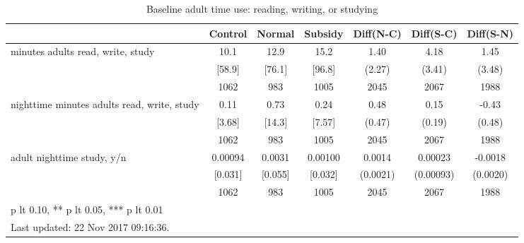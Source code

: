 \begin{table}[htbp]\centering
\def\sym#1{\ifmmode^{#1}\else\(^{#1}\)\fi}
\caption{Baseline adult time use: reading, writing, or studying \label{tab:"balance"}}
\begin{tabular*}{1\hsize}{@{\hskip\tabcolsep\extracolsep\fill}l*{1}{cccccc}}
\toprule
                                &  Control&   Normal&  Subsidy&Diff(N-C)         &Diff(S-C)         &Diff(S-N)         \\
\midrule
minutes adults read, write, study&     10.1&     12.9&     15.2&     1.40         &     4.18         &     1.45         \\
                                &   [58.9]&   [76.1]&   [96.8]&   (2.27)         &   (3.41)         &   (3.48)         \\
                                &     1062&      983&     1005&     2045         &     2067         &     1988         \\
nighttime minutes adults read, write, study&     0.11&     0.73&     0.24&     0.48         &     0.15         &    -0.43         \\
                                &   [3.68]&   [14.3]&   [7.57]&   (0.47)         &   (0.19)         &   (0.48)         \\
                                &     1062&      983&     1005&     2045         &     2067         &     1988         \\
adult nighttime study, y/n      &  0.00094&   0.0031&  0.00100&   0.0014         &  0.00023         &  -0.0018         \\
                                &  [0.031]&  [0.055]&  [0.032]& (0.0021)         &(0.00093)         & (0.0020)         \\
                                &     1062&      983&     1005&     2045         &     2067         &     1988         \\
\bottomrule
\multicolumn{7}{l}{\footnotesize * p lt 0.10, ** p lt 0.05, *** p lt 0.01}\\
\multicolumn{7}{l}{\footnotesize Last updated: 22 Nov 2017 09:16:36.}\\
\end{tabular*}
\end{table}
